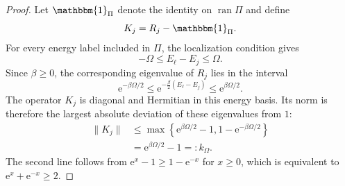 \documentclass[aps,floatfix,10pt,amssymb,amsmath,superscriptaddress,nofootinbib,longbibliography,nobalancelastpage,twocolumn]{revtex4-2}
\newcommand{\id}{\mathbbm{1}}
\newcommand{\e}{\mathrm{e}}
\begin{document}
\begin{proof}
Let $\id_\Pi$ denote the identity on $\operatorname{ran}\Pi$ and define
\begin{equation}
 K_j=R_j-\id_\Pi.
 \label{eq:Kj}
\end{equation}
For every energy label included in $\Pi$, the localization condition gives
\begin{equation}
 -\Omega\leq E_\ell-E_j\leq\Omega.
\end{equation}
Since $\beta\geq0$, the corresponding eigenvalue of $R_j$ lies in the interval
\begin{equation}
 \e^{-\beta\Omega/2}
 \leq\e^{-\frac\beta2(E_\ell-E_j)}
 \leq\e^{\beta\Omega/2}.
 \label{eq:R-spectrum}
\end{equation}
The operator $K_j$ is diagonal and Hermitian in this energy basis.  Its norm is therefore the largest absolute deviation of these eigenvalues from $1$:
\begin{align}
 \|K_j\|
 &\leq\max\left\{
 \e^{\beta\Omega/2}-1,
 1-\e^{-\beta\Omega/2}\right\}\nonumber\\
 &=\e^{\beta\Omega/2}-1=:k_\Omega.
 \label{eq:Kj-bound}
\end{align}
The second line follows from
$\e^x-1\geq1-\e^{-x}$ for $x\geq0$, which is equivalent to $\e^x+\e^{-x}\geq2$.


\end{proof}
\end{document}

